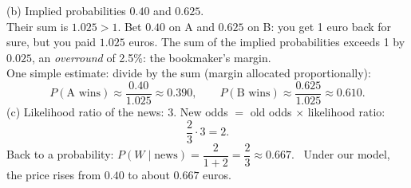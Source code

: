 \begin{slides}
	\small
	(b) Implied probabilities $0.40$ and $0.625$.\\[1mm]
	\pause
	Their sum is $1.025>1$. Bet $0.40$ on A and $0.625$ on B: you get 1 euro
	back for sure, but you paid $1.025$ euros. The sum of the implied probabilities
	exceeds 1 by $0.025$, an \emph{overround} of 2.5\%: the bookmaker's
	margin.\\[1mm]
	\pause
	One simple estimate: divide by the sum (margin allocated proportionally):
	\[ P(\text{A wins})\approx\frac{0.40}{1.025}\approx 0.390,\qquad
		P(\text{B wins})\approx\frac{0.625}{1.025}\approx 0.610. \]
	\pause
	(c) Likelihood ratio of the news: $3$. New odds $=$ old odds $\times$
	likelihood ratio:
	\[ \frac23\cdot 3=2. \]
	\pause
	Back to a probability:
	$P(W\mid\text{news})=\dfrac{2}{1+2}=\dfrac23\approx 0.667$. \ Under our
	model, the price rises from $0.40$ to about $0.667$ euros.
\end{slides}

